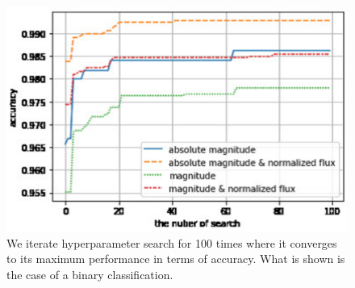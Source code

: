 \documentclass[useamsfonts]{pasj01}
\begin{document}
\begin{figure}[ht]
  \begin{center}
     \includegraphics[width=\columnwidth]{figures/hp_iterations_accuracy.eps}
  \end{center}
  \caption{%
  We iterate hyperparameter search for 100 times where it converges to its maximum performance in 
terms of accuracy.   What is shown is the case of a binary classification.
  }%
  \label{fig:hp_test}
\end{figure}
%
\end{document}
